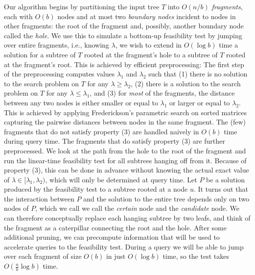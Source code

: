 \documentclass[a4paper,UKenglish]{lipics-v2016}
\theoremstyle{plain}
\begin{document}
Our algorithm begins by partitioning the input tree $T$ into $O(n/b)$ {\em fragments}, each with $O(b)$ nodes and at most two {\em boundary nodes} incident to nodes in other fragments: the root of the fragment and, possibly, another boundary node called the {\em hole}.
We use this to simulate a bottom-up feasibility test by jumping over entire 
fragments, i.e., knowing $\lambda$, we wish to extend in $O(\log b)$ time a solution for a subtree of $T$ rooted at the fragment's hole to a subtree of $T$ rooted at the fragment's root. This is achieved by efficient preprocessing: 
% 
The first step of the preprocessing computes values $\lambda_1$ and  $\lambda_2$ such that (1) there is no solution to the search problem on $T$ for any $\lambda \geq \lambda_2$, (2) there is a solution to the search problem on $T$ for any $\lambda \le \lambda_1$, and (3) for {\em most} of the fragments, the distance between any two nodes is either smaller or equal to $\lambda_1$ or larger or equal to $\lambda_2$. This is achieved by applying Frederickson's parametric search on sorted matrices capturing the pairwise distances between nodes in the same fragment. The (few) fragments that do not satisfy property (3) are handled naively in $O(b)$ time during query time. 
The fragments that do satisfy property (3) are further preprocessed. We look at the path from the hole to the root of the
fragment and run the linear-time feasibility test for all subtrees hanging off from it. Because of property (3), this can be done in advance without knowing the actual exact value of $\lambda \in [\lambda_1,\lambda_2)$, which will only be determined at query time. 
Let $P$ be a solution produced by the feasibility test to a subtree rooted at a node $u$. It turns out that the interaction between $P$ and the solution to the entire tree depends only on two nodes of $P$, which we call we call the {\em certain} node and the {\em candidate} node. We can therefore conceptually replace each hanging subtree by two leafs, and think of the fragment as a caterpillar connecting the root and the hole. 
After some additional pruning, we can precompute information 
that will be used to accelerate queries to the feasibility test. During a query we will be able to jump over each fragment of size $O(b)$ in just $O(\log b)$ time, so the test takes $O(\frac{n}{b}\log b)$ time.
\end{document}
